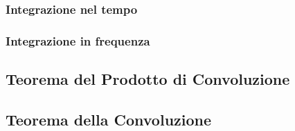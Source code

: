 \documentclass[12pt,oneside,openany]{memoir}
\numberwithin{equation}{subsection}
\begin{document}

\newpage
\subsubsection{Integrazione nel tempo}


\newpage
\subsubsection{Integrazione in frequenza}


\newpage
\subsection{Teorema del Prodotto di Convoluzione}


\newpage
\subsection{Teorema della Convoluzione}


\newpage	
\end{document}

